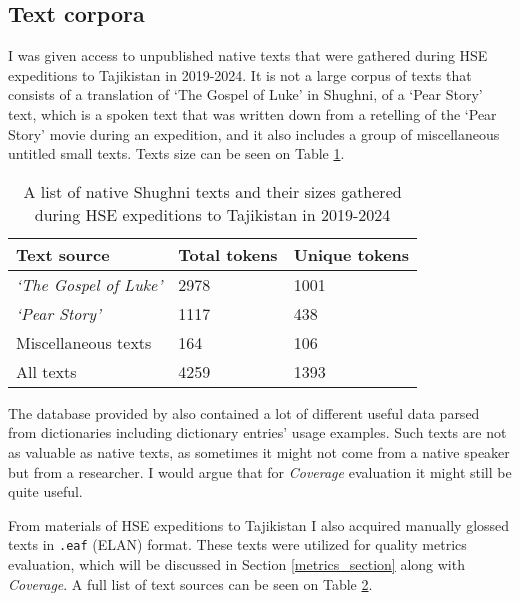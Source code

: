 \subsection{Text corpora}
I was given access to unpublished native texts that were gathered during HSE expeditions to Tajikistan in 2019-2024. It is not a large corpus of texts that consists of a translation of `The Gospel of Luke' in Shughni, of a `Pear Story' text, which is a spoken text that was written down from a retelling of the `Pear Story' movie during an expedition, and it also includes a group of miscellaneous untitled small texts. Texts size can be seen on Table \hyperref[Tab:native_texts]{1}.

\begin{table}[!h]
    \begin{center}
        \begin{tabular}{|l|l|l|}
            \hline
            \textbf{Text source} & \textbf{Total tokens} & \textbf{Unique tokens} \\
            \hline
            \textit{`The Gospel of Luke'} & 2978 & 1001 \\
            \textit{`Pear Story'} & 1117 & 438 \\
            Miscellaneous texts & 164 & 106 \\
            \hline
            All texts & 4259 & 1393 \\
            \hline
        \end{tabular}
        \caption{A list of native Shughni texts and their sizes gathered during HSE expeditions to Tajikistan in 2019-2024}
        \label{Tab:native_texts}
    \end{center}
\end{table}

The database provided by \textcite{makarov_digital_2022} also contained a lot of different useful data parsed from dictionaries including dictionary entries' usage examples. Such texts are not as valuable as native texts, as sometimes it might not come from a native speaker but from a researcher. I would argue that for \textit{Coverage} evaluation it might still be quite useful. 

From materials of HSE expeditions to Tajikistan I also acquired manually glossed texts in \texttt{.eaf} (ELAN) format. These texts were utilized for quality metrics evaluation, which will be discussed in Section \ref{metrics_section} along with \textit{Coverage}. A full list of text sources can be seen on Table \hyperref[Tab:all_texts]{2}.

